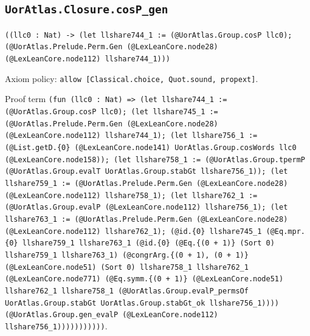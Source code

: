 \documentclass[11pt]{article}
\begin{document}
\subsection*{\texttt{UorAtlas.Closure.cosP\_gen}}
\noindent\texttt{((llc0 : Nat) -> (let llshare744\_1 := (@UorAtlas.Group.cosP llc0); (@UorAtlas.Prelude.Perm.Gen (@LexLeanCore.node28) (@LexLeanCore.node112) llshare744\_1)))}\par
\noindent Axiom policy: \texttt{allow [Classical.choice, Quot.sound, propext]}.\par
\noindent Proof term \texttt{(fun (llc0 : Nat) => (let llshare744\_1 := (@UorAtlas.Group.cosP llc0); (let llshare745\_1 := (@UorAtlas.Prelude.Perm.Gen (@LexLeanCore.node28) (@LexLeanCore.node112) llshare744\_1); (let llshare756\_1 := (@List.getD.\{0\} (@LexLeanCore.node141) UorAtlas.Group.cosWords llc0 (@LexLeanCore.node158)); (let llshare758\_1 := (@UorAtlas.Group.tpermP (@UorAtlas.Group.evalT UorAtlas.Group.stabGt llshare756\_1)); (let llshare759\_1 := (@UorAtlas.Prelude.Perm.Gen (@LexLeanCore.node28) (@LexLeanCore.node112) llshare758\_1); (let llshare762\_1 := (@UorAtlas.Group.evalP (@LexLeanCore.node112) llshare756\_1); (let llshare763\_1 := (@UorAtlas.Prelude.Perm.Gen (@LexLeanCore.node28) (@LexLeanCore.node112) llshare762\_1); (@id.\{0\} llshare745\_1 (@Eq.mpr.\{0\} llshare759\_1 llshare763\_1 (@id.\{0\} (@Eq.\{(0 + 1)\} (Sort 0) llshare759\_1 llshare763\_1) (@congrArg.\{(0 + 1), (0 + 1)\} (@LexLeanCore.node51) (Sort 0) llshare758\_1 llshare762\_1 (@LexLeanCore.node771) (@Eq.symm.\{(0 + 1)\} (@LexLeanCore.node51) llshare762\_1 llshare758\_1 (@UorAtlas.Group.evalP\_permsOf UorAtlas.Group.stabGt UorAtlas.Group.stabGt\_ok llshare756\_1)))) (@UorAtlas.Group.gen\_evalP (@LexLeanCore.node112) llshare756\_1)))))))))))}.\par
\end{document}
